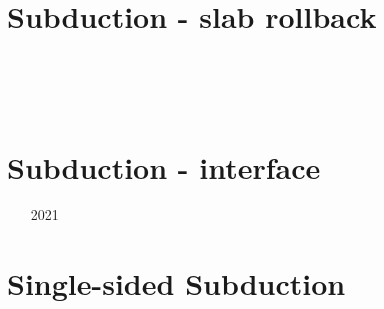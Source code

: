 \section{Subduction - slab rollback} 

\begin{small}
\begin{itemize}
\item[\twothousandthree] 
\item[\twothousandsix] 
\item[\twothousandnine] 
\item[\twothousandnine] 
\item[\twothousandtwelve] 
\item[\twothousandthirteen] 
 \\
\item[\twothousandfourteen]
 \\
\item[\twothousandfifteen]
\item[\twothousandtwenty]
\end{itemize}
\end{small}


\section{Subduction - interface} 

\begin{small}
\begin{itemize}
\item[2021]
\end{itemize}
\end{small}

\section{Single-sided Subduction}

